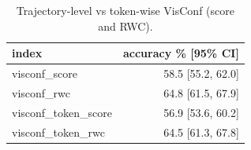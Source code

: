 \begin{table}[t]
\centering\small
\begin{tabular}{lr}
\toprule
index & accuracy \% [95\% CI] \\
\midrule
visconf\_score & 58.5 [55.2, 62.0] \\
visconf\_rwc & 64.8 [61.5, 67.9] \\
visconf\_token\_score & 56.9 [53.6, 60.2] \\
visconf\_token\_rwc & 64.5 [61.3, 67.8] \\
\bottomrule
\end{tabular}
\caption{Trajectory-level vs token-wise VisConf (score and RWC).}
\label{tab:task3_visconf_ablation}
\end{table}
